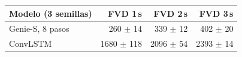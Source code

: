 \begin{tabular}{lrrr}
\toprule
Modelo (3 semillas) & FVD 1\,s & FVD 2\,s & FVD 3\,s \\
\midrule
Genie-S, 8 pasos & 260 $\pm$ 14 & 339 $\pm$ 12 & 402 $\pm$ 20 \\
ConvLSTM & 1680 $\pm$ 118 & 2096 $\pm$ 54 & 2393 $\pm$ 14 \\
\bottomrule
\end{tabular}
